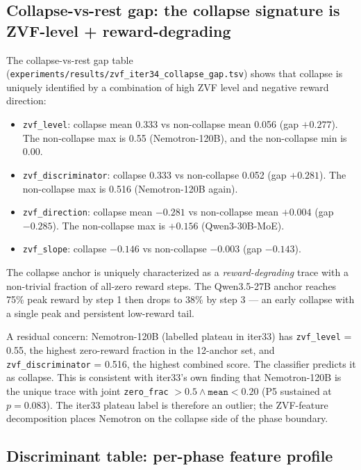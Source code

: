 \documentclass{article}
\begin{document}
\subsection{Collapse-vs-rest gap: the collapse signature is
ZVF-level + reward-degrading}
\label{sec:zvf-iter34-collapse}

The collapse-vs-rest gap table
(\texttt{experiments/results/zvf\_iter34\_collapse\_gap.tsv})
shows that collapse is uniquely identified by a combination of
high ZVF level and negative reward direction:

\begin{itemize}
\item \texttt{zvf\_level}: collapse mean 0.333 vs non-collapse mean
0.056 (gap $+0.277$). The non-collapse max is 0.55
(Nemotron-120B), and the non-collapse min is 0.00.
\item \texttt{zvf\_discriminator}: collapse 0.333 vs non-collapse
0.052 (gap $+0.281$). The non-collapse max is 0.516
(Nemotron-120B again).
\item \texttt{zvf\_direction}: collapse mean $-0.281$ vs
non-collapse mean $+0.004$ (gap $-0.285$). The non-collapse max
is $+0.156$ (Qwen3-30B-MoE).
\item \texttt{zvf\_slope}: collapse $-0.146$ vs non-collapse
$-0.003$ (gap $-0.143$).
\end{itemize}

The collapse anchor is uniquely characterized as a
\emph{reward-degrading} trace with a non-trivial fraction of
all-zero reward steps. The Qwen3.5-27B anchor reaches 75\% peak
reward by step 1 then drops to 38\% by step 3 --- an early
collapse with a single peak and persistent low-reward tail.

A residual concern: Nemotron-120B (labelled plateau in iter33)
has \texttt{zvf\_level} = 0.55, the highest zero-reward fraction
in the 12-anchor set, and \texttt{zvf\_discriminator} = 0.516, the
highest combined score. The classifier predicts it as collapse.
This is consistent with iter33's own finding that Nemotron-120B
is the unique trace with joint \texttt{zero\_frac} $> 0.5 \wedge
\texttt{mean} < 0.20$ (P5 sustained at $p = 0.083$). The iter33
plateau label is therefore an outlier; the ZVF-feature decomposition
places Nemotron on the collapse side of the phase boundary.

\subsection{Discriminant table: per-phase feature profile}
\label{sec:zvf-iter34-discriminant}
\end{document}
